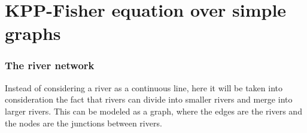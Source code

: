 \section{KPP-Fisher equation over simple graphs}


\begin{frame}
    \frametitle{The river network}
    Instead of considering a river as a continuous line, here it will be taken into consideration the fact that rivers can divide into smaller rivers and merge into larger rivers. This can be modeled as a graph, where the edges are the rivers and the nodes are the junctions between rivers.
\begin{figure}[H]
    \centering
    \scalebox{0.6}{\begin{tikzpicture}[x=0.75pt,y=0.75pt,yscale=-1,xscale=1]


\end{tikzpicture}}
\end{figure}
\end{frame}
